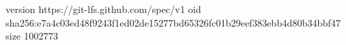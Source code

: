 version https://git-lfs.github.com/spec/v1
oid sha256:e7a4c03ed48f9243f1ed02de15277bd65326fc01b29eef383ebb4d80b34bbf47
size 1002773
